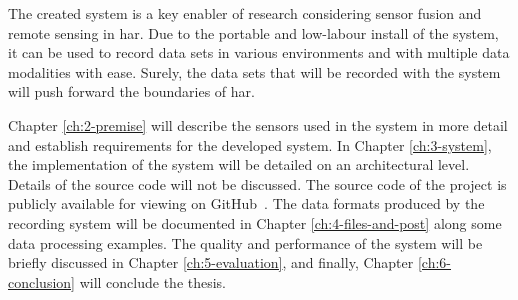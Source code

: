 The created system is a key enabler of research considering sensor fusion and remote sensing in \gls{har}.
Due to the portable and low-labour install of the system,
it can be used to record data sets in various environments and with multiple data modalities with ease.
Surely, the data sets that will be recorded with the system will push forward the boundaries of \gls{har}.

Chapter \ref{ch:2-premise} will describe the sensors used in the system in more detail and establish requirements for the developed system.
In Chapter \ref{ch:3-system}, the implementation of the system will be detailed on an architectural level.
Details of the source code will not be discussed. The source code of the project is publicly available for viewing on GitHub~\cite{github-link}.
The data formats produced by the recording system will be documented in Chapter \ref{ch:4-files-and-post} along some data processing examples.
The quality and performance of the system will be briefly discussed in Chapter \ref{ch:5-evaluation},
and finally, Chapter \ref{ch:6-conclusion} will conclude the thesis.